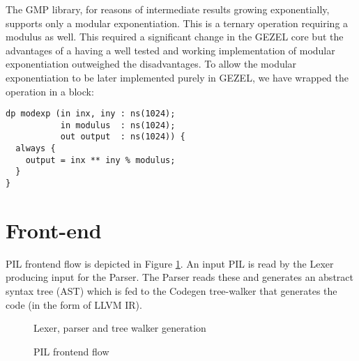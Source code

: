 The GMP library, for reasons of intermediate results growing
exponentially, supports only a modular exponentiation. This is a
ternary operation requiring a modulus as well. This required a
significant change in the GEZEL core but the advantages of a having a
well tested and working implementation of modular exponentiation
outweighed the disadvantages. To allow the modular exponentiation to
be later implemented purely in GEZEL, we have wrapped the operation in
a block:
\begin{lstlisting}[language=GEZEL]
dp modexp (in inx, iny : ns(1024);
           in modulus  : ns(1024);
           out output  : ns(1024)) {
  always {
    output = inx ** iny % modulus;
  }
}
\end{lstlisting}

\section{Front-end}
\label{sec:pil_frontend}

PIL frontend flow is depicted in Figure \ref{fig:pil_frontend_flow}.  An
input PIL is read by the Lexer producing input for the Parser. The
Parser reads these and generates an abstract syntax tree (AST) which
is fed to the Codegen tree-walker that generates the code (in the form
of LLVM IR).

\begin{figure}[hb!]
  \centering
   \qquad
  \caption{Lexer, parser and tree walker generation}
\end{figure}

\begin{figure}[hb!]  
  \caption{PIL frontend flow}
  \label{fig:pil_frontend_flow}
\end{figure}

